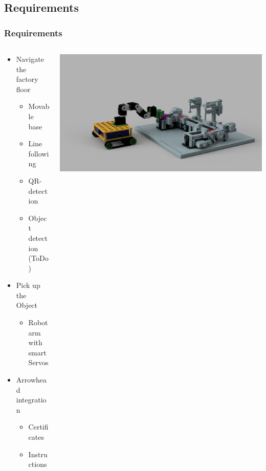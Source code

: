 \subsection{Requirements}
\begin{frame}
    \frametitle{Requirements}

    \begin{columns}
        \begin{column}[]{0.5\textwidth}
            \begin{itemize}
                \item Navigate the factory floor
                \begin{itemize}
                    \item Movable base
                    \item Line following
                    \item QR-detection
                    \item Object detection (ToDo)
                \end{itemize}
                \item Pick up the Object
                \begin{itemize}
                    \item Robot arm with smart Servos
                \end{itemize}
                \item Arrowhead integration
                \begin{itemize}
                    \item Certificates
                    \item Instructions
                \end{itemize}
            \end{itemize}
        \end{column}

        \begin{column}[]{0.5\textwidth}
            \includegraphics[width=\textwidth]{frames/img/b4_manufacturing.PNG}
        \end{column}
    \end{columns}
    
\end{frame}